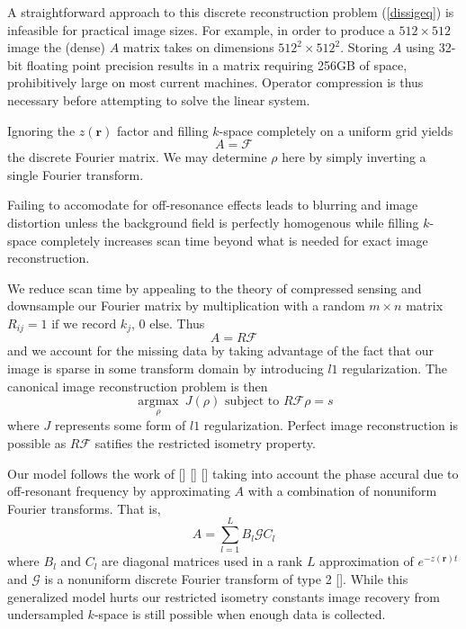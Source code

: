\documentclass[11pt]{amsart}
\theoremstyle{remark}
\begin{document}
A straightforward approach to this discrete reconstruction problem (\ref{dissigeq}) is infeasible for practical image sizes. For example, in order to produce a $512 \times 512$ image the (dense) $A$ matrix takes on dimensions $512^2 \times 512^2$. Storing $A$ using 32-bit floating point precision results in a matrix requiring 256GB of space, prohibitively large on most current machines. Operator compression is thus necessary before attempting to solve the linear system.

Ignoring the $z(\mathbf{r})$ factor and filling $k$-space completely on a uniform grid yields
\begin{equation}
A = \mathcal{F}
\end{equation}
the discrete Fourier matrix. We may determine $\rho$ here by simply inverting a single Fourier transform.

Failing to accomodate for off-resonance effects leads to blurring and image distortion unless the background field is perfectly homogenous while filling $k$-space completely increases scan time beyond what is needed for exact image reconstruction.

We reduce scan time by appealing to the theory of compressed sensing and downsample our Fourier matrix by multiplication with a random $m \times n$ matrix $R_{ij} = 1 \text{ if we record } k_j \text{, } 0 \text{ else}$. Thus
\begin{equation}
A = R\mathcal{F}
\end{equation}
and we account for the missing data by taking advantage of the fact that our image is sparse in some transform domain by introducing $l1$ regularization. The canonical image reconstruction problem is then
\begin{equation}\label{csequ}
\underset{\rho}{\operatorname{argmax}} \: J(\rho)  \text{ subject to } R\mathcal{F} \rho = s
\end{equation}
where $J$ represents some form of $l1$ regularization. Perfect image reconstruction is possible as $R\mathcal{F}$ satifies the restricted isometry property.

Our model follows the work of [] [] [] taking into account the phase accural due to off-resonant frequency by approximating $A$ with a combination of nonuniform Fourier transforms. That is,
\begin{equation}
A = \sum_{l=1}^L B_l \mathcal{G} C_l 
\end{equation}
where $B_l$ and $C_l$ are diagonal matrices used in a rank $L$ approximation of $e^{-z(\mathbf{r})t}$ and $\mathcal{G}$ is a nonuniform discrete Fourier transform of type 2 []. While this generalized model hurts our restricted isometry constants image recovery from undersampled $k$-space is still possible when enough data is collected.
\end{document}
